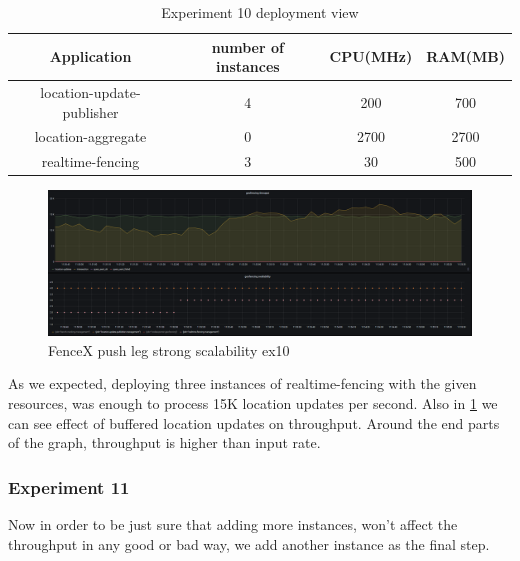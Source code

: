 \documentclass[a4]{report}
\begin{document}
    \begin{table}[h!]
        \centering
        \begin{tabular}{|c|c|c|c|}
            \hline
            Application               & number of instances & CPU(MHz) & RAM(MB) \\
            \hline
            location-update-publisher & 4                   & 200      & 700     \\
            location-aggregate        & 0                   & 2700     & 2700    \\
            realtime-fencing          & 3                   & 30       & 500     \\
            \hline
        \end{tabular}
        \caption{Experiment 10 deployment view}
        \label{table:ex10-dv}
    \end{table}

    \begin{figure}[ht]
        \caption{FenceX push leg strong scalability ex10}
        \label{fig:ex10}
        \includegraphics[scale=0.4]{images/evaluation/ex10-benchmarking-ongoing-2per4sec.png}
    \end{figure}

    As we expected, deploying three instances of realtime-fencing with the given resources, was enough to process 15K
    location updates per second.
    Also in \ref{fig:ex10} we can see effect of buffered location updates on throughput.
    Around the end parts of the graph, throughput is higher than input rate.

    \clearpage

    \subsubsection{Experiment 11}
    Now in order to be just sure that adding more instances, won't affect the throughput in any good or bad way, we
    add another instance as the final step.
\end{document}
